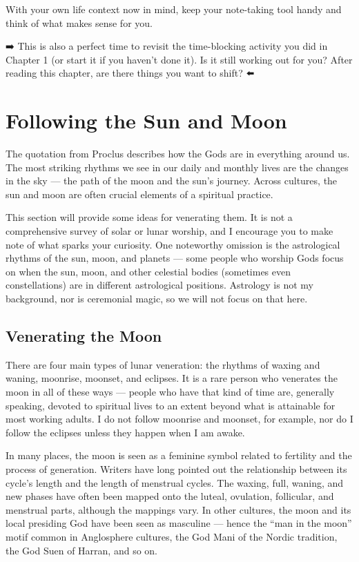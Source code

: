 \documentclass[
]{book}
\begin{document}
With your own life context now in mind, keep your note-taking tool handy and think of what makes sense for you.

➡️ This is also a perfect time to revisit the time-blocking activity you did in Chapter 1 (or start it if you haven't done it). Is it still working out for you? After reading this chapter, are there things you want to shift? ⬅️

\hypertarget{following-the-sun-and-moon}{%
\section{Following the Sun and Moon}\label{following-the-sun-and-moon}}

The quotation from Proclus describes how the Gods are in everything around us. The most striking rhythms we see in our daily and monthly lives are the changes in the sky --- the path of the moon and the sun's journey. Across cultures, the sun and moon are often crucial elements of a spiritual practice.

This section will provide some ideas for venerating them. It is not a comprehensive survey of solar or lunar worship, and I encourage you to make note of what sparks your curiosity. One noteworthy omission is the astrological rhythms of the sun, moon, and planets --- some people who worship Gods focus on when the sun, moon, and other celestial bodies (sometimes even constellations) are in different astrological positions. Astrology is not my background, nor is ceremonial magic, so we will not focus on that here.

\hypertarget{venerating-the-moon}{%
\subsection{Venerating the Moon}\label{venerating-the-moon}}

There are four main types of lunar veneration: the rhythms of waxing and waning, moonrise, moonset, and eclipses. It is a rare person who venerates the moon in all of these ways --- people who have that kind of time are, generally speaking, devoted to spiritual lives to an extent beyond what is attainable for most working adults. I do not follow moonrise and moonset, for example, nor do I follow the eclipses unless they happen when I am awake.

In many places, the moon is seen as a feminine symbol related to fertility and the process of generation. Writers have long pointed out the relationship between its cycle's length and the length of menstrual cycles. The waxing, full, waning, and new phases have often been mapped onto the luteal, ovulation, follicular, and menstrual parts, although the mappings vary. In other cultures, the moon and its local presiding God have been seen as masculine --- hence the ``man in the moon'' motif common in Anglosphere cultures, the God Mani of the Nordic tradition, the God Suen of Harran, and so on.
\end{document}
